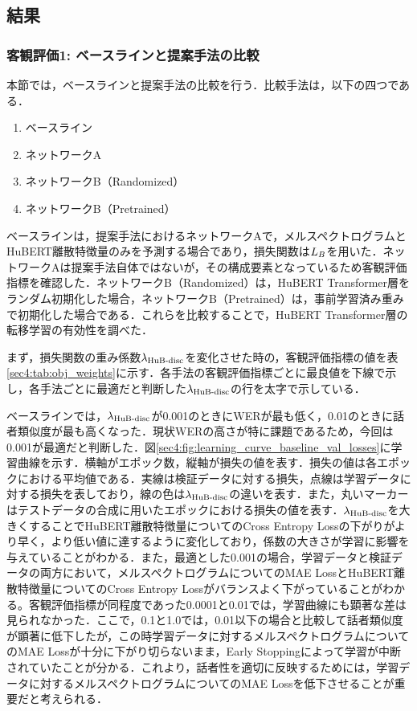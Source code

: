 \subsection{結果}
\subsubsection{客観評価1: ベースラインと提案手法の比較}
\label{sec4:sec:obj_1}
本節では，ベースラインと提案手法の比較を行う．比較手法は，以下の四つである．
\begin{enumerate}
    \item ベースライン
    \item ネットワークA
    \item ネットワークB（Randomized）
    \item ネットワークB（Pretrained）
\end{enumerate}
ベースラインは，提案手法におけるネットワークAで，メルスペクトログラムとHuBERT離散特徴量のみを予測する場合であり，損失関数は$L_{B}$を用いた．ネットワークAは提案手法自体ではないが，その構成要素となっているため客観評価指標を確認した．ネットワークB（Randomized）は，HuBERT Transformer層をランダム初期化した場合，ネットワークB（Pretrained）は，事前学習済み重みで初期化した場合である．これらを比較することで，HuBERT Transformer層の転移学習の有効性を調べた．

まず，損失関数の重み係数$\lambda_{\text{HuB-disc}}$を変化させた時の，客観評価指標の値を表\ref{sec4:tab:obj_weights}に示す．各手法の客観評価指標ごとに最良値を下線で示し，各手法ごとに最適だと判断した$\lambda_{\text{HuB-disc}}$の行を太字で示している．

ベースラインでは，$\lambda_{\text{HuB-disc}}$が0.001のときにWERが最も低く，0.01のときに話者類似度が最も高くなった．現状WERの高さが特に課題であるため，今回は0.001が最適だと判断した．図\ref{sec4:fig:learning_curve_baseline_val_losses}に学習曲線を示す．横軸がエポック数，縦軸が損失の値を表す．損失の値は各エポックにおける平均値である．実線は検証データに対する損失，点線は学習データに対する損失を表しており，線の色は$\lambda_{\text{HuB-disc}}$の違いを表す．また，丸いマーカーはテストデータの合成に用いたエポックにおける損失の値を表す．$\lambda_{\text{HuB-disc}}$を大きくすることでHuBERT離散特徴量についてのCross Entropy Lossの下がりがより早く，より低い値に達するように変化しており，係数の大きさが学習に影響を与えていることがわかる．また，最適とした0.001の場合，学習データと検証データの両方において，メルスペクトログラムについてのMAE LossとHuBERT離散特徴量についてのCross Entropy Lossがバランスよく下がっていることがわかる。客観評価指標が同程度であった0.0001と0.01では，学習曲線にも顕著な差は見られなかった．ここで，0.1と1.0では，0.01以下の場合と比較して話者類似度が顕著に低下したが，この時学習データに対するメルスペクトログラムについてのMAE Lossが十分に下がり切らないまま，Early Stoppingによって学習が中断されていたことが分かる．これより，話者性を適切に反映するためには，学習データに対するメルスペクトログラムについてのMAE Lossを低下させることが重要だと考えられる．

